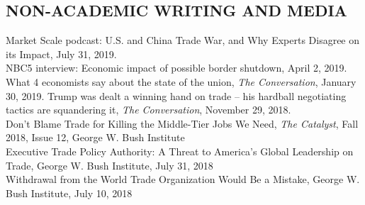 \documentclass[11pt]{res}
\begin{document}
\begin{resume}
\section{NON-ACADEMIC WRITING AND MEDIA}\vspace{1.5mm}
Market Scale podcast: U.S. and China Trade War, and Why Experts Disagree on its Impact, July 31, 2019.\vspace{1.5mm}\\
NBC5 interview: Economic impact of possible border shutdown, April 2, 2019.\vspace{1.5mm}\\
What 4 economists say about the state of the union, \emph{The Conversation}, January 30, 2019.
Trump was dealt a winning hand on trade – his hardball negotiating tactics are squandering it, \emph{The Conversation}, November 29, 2018.\vspace{1.5mm}\\
Don't Blame Trade for Killing the Middle-Tier Jobs We Need, \emph{The Catalyst}, Fall 2018, Issue 12, George W. Bush Institute\vspace{1.5mm}\\
Executive Trade Policy Authority: A Threat to America’s Global Leadership on Trade, George W. Bush Institute, July 31, 2018\vspace{1.5mm}\\
Withdrawal from the World Trade Organization Would Be a Mistake, George W. Bush Institute, July 10, 2018\vspace{1.5mm}\\






\end{resume}
\end{document}
